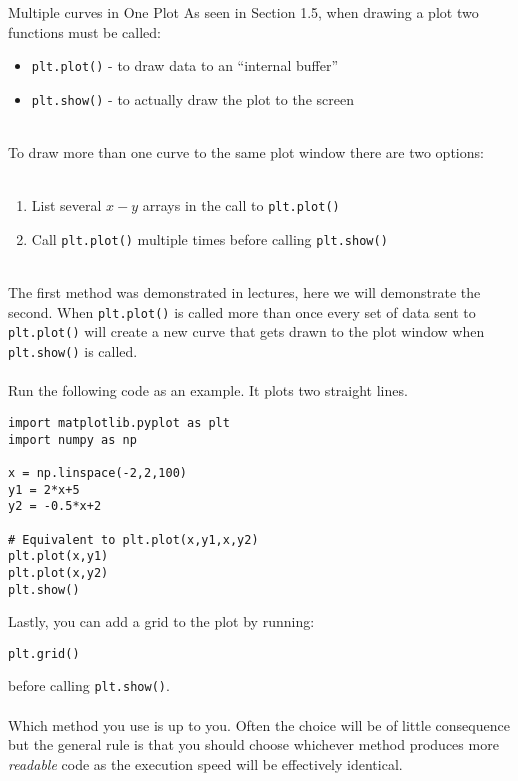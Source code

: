\documentclass{lab}
\begin{document}
\begin{task}{Multiple curves in One Plot}{}
As seen in Section 1.5, when drawing a plot two functions must be called:
\\
\begin{itemize}
\item \texttt{plt.plot()} - to draw data to an ``internal buffer''
\item \texttt{plt.show()} - to actually draw the plot to the screen
\end{itemize}
~\\
To draw more than one curve to the same plot window there are two options:
\\~
\begin{enumerate}
\item List several $x-y$ arrays in the call to \texttt{plt.plot()}
\item Call \texttt{plt.plot()} multiple times before calling \texttt{plt.show()}
\end{enumerate}
~\\
The first method was demonstrated in lectures, here we will demonstrate the second. When \texttt{plt.plot()} is called more than once every set of data sent to \texttt{plt.plot()} will create a new curve that gets drawn to the plot window when \texttt{plt.show()} is called.
\\~\\
Run the following code as an example. It plots two straight lines.
\begin{lstlisting}[style=myPython]
import matplotlib.pyplot as plt
import numpy as np

x = np.linspace(-2,2,100)
y1 = 2*x+5
y2 = -0.5*x+2

# Equivalent to plt.plot(x,y1,x,y2)
plt.plot(x,y1)
plt.plot(x,y2)
plt.show()
\end{lstlisting}

Lastly, you can add a grid to the plot by running:
\begin{lstlisting}
plt.grid()
\end{lstlisting}
before calling \texttt{plt.show()}.
\\~\\
Which method you use is up to you. Often the choice will be of little consequence but the general rule is that you should choose whichever method produces more \textit{readable} code as the execution speed will be effectively identical.
\end{task}
\pagebreak
\end{document}
